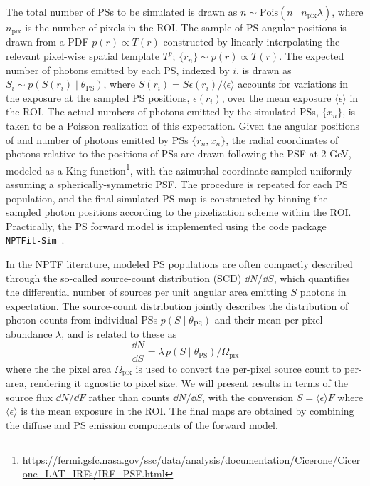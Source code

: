 \documentclass[prd,aps,10pt,nofootinbib,twocolumn,superscriptaddress,preprintnumbers,balancelastpage,longbibliography]{revtex4-1}
\begin{document}
The total number of PSs to be simulated is drawn as $n \sim \mathrm{Pois}(n\mid n_\mathrm{pix}\lambda)$, where $n_\mathrm{pix}$ is the number of pixels in the ROI. The sample of PS angular positions is drawn from a PDF $p(r) \propto T(r)$ constructed by linearly interpolating the relevant pixel-wise spatial template $T^p$; $\{r_n\} \sim p(r) \propto T(r)$. The expected number of photons emitted by each PS, indexed by $i$, is drawn as $S_i \sim p\left({S(r_i)}\mid\theta_\mathrm{PS}\right)$, where ${S(r_i)} = S \epsilon(r_i) / \langle \epsilon \rangle$ accounts for variations in the \Fermi exposure at the sampled PS positions, $\epsilon(r_i)$, over the mean exposure $\langle \epsilon \rangle$ in the ROI. The actual numbers of photons emitted by the simulated PSs, $\{x_n\}$, is taken to be a Poisson realization of this expectation. Given the angular positions of and number of photons emitted by PSs $\{r_n, x_n\}$, the radial coordinates of photons relative to the positions of PSs are drawn following the \Fermi PSF at 2 GeV, modeled as a King function\footnote{\url{https://fermi.gsfc.nasa.gov/ssc/data/analysis/documentation/Cicerone/Cicerone_LAT_IRFs/IRF_PSF.html}}, with the azimuthal coordinate sampled uniformly assuming a spherically-symmetric PSF. The procedure is repeated for each PS population, and the final simulated PS map is constructed by binning the sampled photon positions according to the \HEALPix pixelization scheme within the ROI. Practically, the PS forward model is implemented using the code package \texttt{NPTFit-Sim}~\cite{NPTFit-Sim}.

In the NPTF literature, modeled PS populations are often compactly described through the so-called source-count distribution (SCD) $\dd N /\dd S$, which quantifies the differential number of sources per unit angular area emitting $S$ photons in expectation. The source-count distribution jointly describes the distribution of photon counts from individual PSs $p(S\mid\theta_\mathrm{PS})$ and their mean per-pixel abundance $\lambda$, and is related to these as
\begin{equation}
\label{eq:scd_ps}
\frac{\dd N}{\dd S}=\lambda \, p(S\mid\theta_\mathrm{PS}) / \Omega_\mathrm{pix}
\end{equation}
where the the pixel area $\Omega_\mathrm{pix}$ is used to convert the per-pixel source count to per-area, rendering it agnostic to pixel size. We will present results in terms of the source flux $\dd N /\dd F$ rather than counts $\dd N /\dd S$, with the conversion $S = \langle \epsilon \rangle F$ where $\langle \epsilon \rangle$ is the mean exposure in the ROI. The final maps are obtained by combining the diffuse and PS emission components of the forward model.
\end{document}
